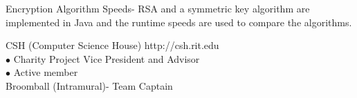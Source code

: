 \documentclass[10pt]{article} %
\begin{document}
	\noindent Encryption Algorithm Speeds- RSA and a symmetric key algorithm are implemented in Java and the runtime speeds are used to compare the algorithms.
	

\bigskip


	\newline
		CSH (Computer Science House)	\hfill http://csh.rit.edu\\
			\indent $\bullet$ Charity Project Vice President and Advisor\\
			\indent $\bullet$ Active member\\
		Broomball (Intramural)- Team Captain
	
\end{document}
